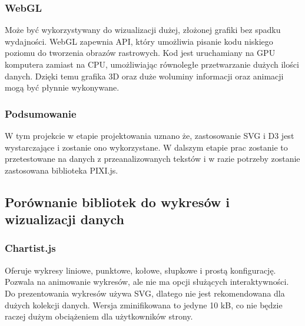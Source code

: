 \documentclass[12pt,a4paper]{article} %
\begin{document}
    \subsubsection{WebGL}
        Może być wykorzystywany do wizualizacji dużej, złożonej grafiki bez spadku wydajności. WebGL zapewnia API, który umożliwia pisanie kodu niskiego poziomu do tworzenia obrazów rastrowych. Kod jest uruchamiany na GPU komputera zamiast na CPU, umożliwiając równoległe przetwarzanie dużych ilości danych. Dzięki temu grafika 3D oraz duże woluminy informacji oraz animacji mogą być płynnie wykonywane.
        
        
        
    \subsubsection{Podsumowanie}
        W tym projekcie w etapie projektowania uznano że, zastosowanie SVG i D3 jest wystarczające i zostanie ono wykorzystane. W dalszym etapie prac zostanie to przetestowane na danych z przeanalizowanych tekstów i w razie potrzeby zostanie zastosowana biblioteka PIXI.js.
        
\newpage

\subsection{Porównanie bibliotek do wykresów i wizualizacji danych}

   \begin{figure}[h]
        \label{fig:highlight}
        \centering
    \end{figure} 





    \subsubsection{Chartist.js}
        Oferuje wykresy liniowe, punktowe, kołowe, słupkowe i prostą konfigurację. Pozwala na animowanie wykresów, ale nie ma opcji służących interaktywności. Do prezentowania wykresów używa SVG, dlatego nie jest rekomendowana dla dużych kolekcji danych. Wersja zminifikowana to jedyne 10 kB, co nie będzie raczej dużym obciążeniem dla użytkowników strony.
\end{document}
